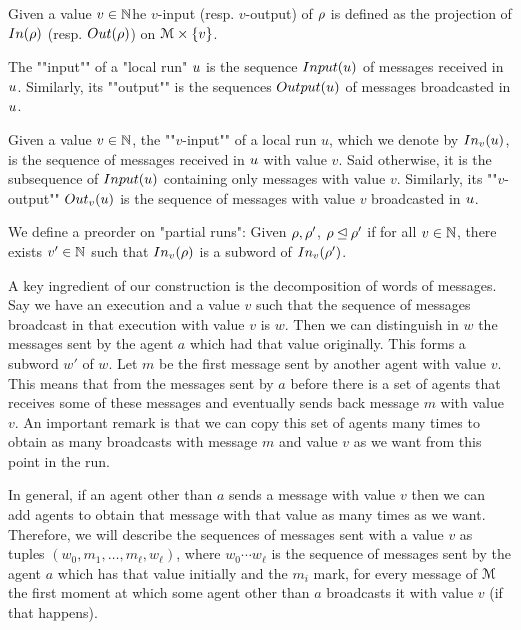 \begin{definition}
	Given a value $v \in \mathbb{N} $he $v$-input (resp. $v$-output) of $\rho$ is defined as the projection of $In(\rho)$ (resp. $Out(\rho)$) on $\mathcal{M} \times \{v\}$.
	

	The ""input"" of a "local run" $u$ is the sequence $Input(u)$ of messages received in $u$. 
	Similarly, its ""output"" is the sequences $Output(u)$ of messages broadcasted in $u$.

	Given a value $v \in \mathbb{N}$, the ""$v$-input"" of a local run $u$, which we denote by $In_{v}(u)$, is the sequence of messages received in  $u$ with value $v$. Said otherwise, it is the subsequence of $Input(u)$ containing only messages with value $v$.
	Similarly, its ""$v$-output"" $Out_{v}(u)$ is the sequence of messages with value $v$ broadcasted in $u$.
	
	
	We define a preorder on "partial runs":
	Given $\rho, \rho'$, $\rho \unlhd \rho'$ if for all $v \in \mathbb{N}$, there exists $v' \in \mathbb{N}$ such that $In_{v}(\rho)$ is a subword of $In_{v}(\rho')$.
\end{definition}

A key ingredient of our construction is the decomposition of words of messages. Say we have an execution and a value $v$ such that the sequence of messages broadcast in that execution with value $v$ is $w$. Then we can distinguish in $w$ the messages sent by the agent $a$ which had that value originally. This forms a subword $w'$ of $w$. Let $m$ be the first message sent by another agent with value $v$. This means that from the messages sent by $a$ before there is a set of agents that receives some of these messages and eventually sends back message $m$ with value $v$. An important remark is that we can copy this set of agents many times to obtain as many broadcasts with message $m$ and value $v$ as we want from this point in the run.

In general, if an agent other than $a$ sends a message with value $v$ then we can add agents to obtain that message with that value as many times as we want.
Therefore, we will describe the sequences of messages sent with a value $v$ as tuples $(w_0, m_1, \ldots, m_\ell, w_\ell)$, where $w_0\cdots w_\ell$ is the sequence of messages sent by the agent $a$ which has that value initially and the $m_i$ mark, for every message of $\mathcal{M}$ the first moment at which some agent other than $a$ broadcasts it with value $v$ (if that happens).

